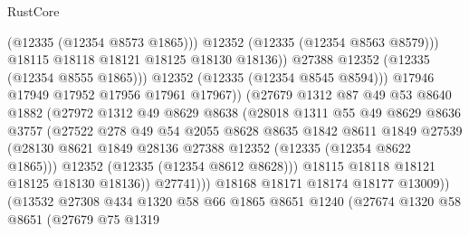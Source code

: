 \begin{lexlean}{RustCore}
\begin{coremodule}
                                    (@12335 (@12354 @8573 @1865)))
                                  @12352
                                  (@12335 (@12354 @8563 @8579)))
                                @18115
                                @18118
                                @18121
                                @18125
                                @18130
                                @18136))
                            @27388
                            @12352
                            (@12335 (@12354 @8555 @1865)))
                          @12352
                          (@12335 (@12354 @8545 @8594)))
                        @17946
                        @17949
                        @17952
                        @17956
                        @17961
                        @17967))
                    (@27679
                      @1312
                      @87
                      @49
                      @53
                      @8640
                      @1882
                      (@27972
                        @1312
                        @49
                        @8629
                        @8638
                        (@28018
                          @1311
                          @55
                          @49
                          @8629
                          @8636
                          @3757
                          (@27522
                            @278
                            @49
                            @54
                            @2055
                            @8628
                            @8635
                            @1842
                            @8611
                            @1849
                            @27539
                            (@28130 @8621 @1849 @28136 @27388 @12352 (@12335 (@12354 @8622 @1865)))
                            @12352
                            (@12335 (@12354 @8612 @8628)))
                          @18115
                          @18118
                          @18121
                          @18125
                          @18130
                          @18136))
                      @27741)))
                @18168
                @18171
                @18174
                @18177
                @13009))
            (@13532
              @27308
              @434
              @1320
              @58
              @66
              @1865
              @8651
              @1240
              (@27674
                @1320
                @58
                @8651
                (@27679
                  @75
                  @1319

\end{coremodule}
\end{lexlean}
